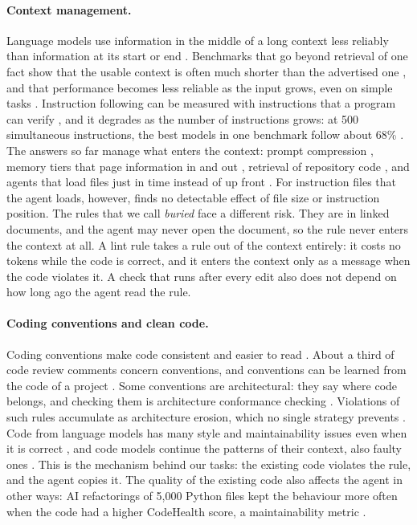 \documentclass[pdflatex,sn-basic]{sn-jnl}
\begin{document}
\paragraph{Context management.}
Language models use information in the middle of a long context less reliably than information at its start or end \citep{liu2024lost}.
Benchmarks that go beyond retrieval of one fact show that the usable context is often much shorter than the advertised one \citep{hsieh2024ruler}, and that performance becomes less reliable as the input grows, even on simple tasks \citep{hong2025contextrot}.
Instruction following can be measured with instructions that a program can verify \citep{zhou2023ifeval}, and it degrades as the number of instructions grows: at 500 simultaneous instructions, the best models in one benchmark follow about 68\% \citep{jaroslawicz2025ifscale}.
The answers so far manage what enters the context: prompt compression \citep{jiang2023llmlingua}, memory tiers that page information in and out \citep{packer2023memgpt}, retrieval of repository code \citep{zhang2023repocoder}, and agents that load files just in time instead of up front \citep{anthropic2025context}.
For instruction files that the agent loads, however, \citet{mcmillan2026adherence} finds no detectable effect of file size or instruction position.
The rules that we call \emph{buried} face a different risk.
They are in linked documents, and the agent may never open the document, so the rule never enters the context at all.
A lint rule takes a rule out of the context entirely: it costs no tokens while the code is correct, and it enters the context only as a message when the code violates it.
A check that runs after every edit also does not depend on how long ago the agent read the rule.

\paragraph{Coding conventions and clean code.}
Coding conventions make code consistent and easier to read \citep{martin2008cleancode}.
About a third of code review comments concern conventions, and conventions can be learned from the code of a project \citep{allamanis2014naturalize}.
Some conventions are architectural: they say where code belongs, and checking them is architecture conformance checking \citep{passos2010conformance}.
Violations of such rules accumulate as architecture erosion, which no single strategy prevents \citep{desilva2012erosion}.
Code from language models has many style and maintainability issues even when it is correct \citep{liu2024refining}, and code models continue the patterns of their context, also faulty ones \citep{dinh2023buggy}.
This is the mechanism behind our tasks: the existing code violates the rule, and the agent copies it.
The quality of the existing code also affects the agent in other ways: AI refactorings of 5,000 Python files kept the behaviour more often when the code had a higher CodeHealth score, a maintainability metric \citep{borg2026codehealth}.
\end{document}
